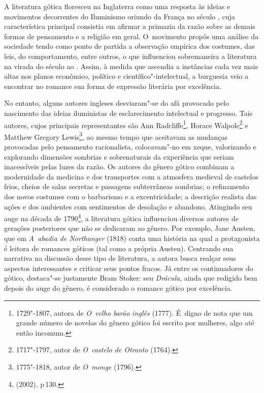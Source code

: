 
A literatura gótica floresceu na Inglaterra como uma resposta às ideias
e movimentos decorrentes do Iluminismo oriundo da França no século
, cuja característica principal consistia em afirmar a primazia da
razão sobre as demais formas de pensamento e a religião em geral. O~movimento propôs uma análise da sociedade tendo como ponto de partida a
observação empírica dos costumes, das leis, do comportamento, entre
outros, o que influenciou sobremaneira a literatura na virada do século
 ao . Assim, à medida que ascendia a instâncias cada vez mais
altas nos planos econômico, político e científico"-intelectual, a
burguesia veio a encontrar no romance sua forma de expressão literária
por excelência.

No entanto, alguns autores ingleses desviaram"-se do afã provocado pelo
nascimento das ideias iluministas de esclarecimento intelectual e
progresso. Tais autores, cujos principais representantes são Ann
Radcliffe\footnote{1729"-1807, autora de \emph{O~velho barão
inglês} (1777). É~digno de nota que um grande número de novelas do
gênero gótico foi escrito por mulheres, algo até então incomum.},
Horace Walpole\footnote{1717"-1797, autor de \emph{O~castelo de
Otranto} (1764).}
 e Matthew Gregory
 Lewis\footnote{1775"-1818, autor de \emph{O~monge} (1796).}, 
ao mesmo tempo que aceitavam as mudanças
provocadas pelo pensamento racionalista, colocavam"-no em xeque,
valorizando e explorando dimensões sombrias e sobrenaturais da
experiência que seriam inacessíveis pelas luzes da razão. Os autores
do gênero gótico combinam a modernidade da medicina e dos transportes
com a atmosfera medieval de castelos frios, cheios de salas secretas e
passagens subterrâneas sombrias; o refinamento dos novos costumes com o
barbarismo e a excentricidade; a descrição realista das ações e dos
ambientes com sentimentos de desolação e abandono. Atingindo seu auge na
década de 1790\footnote{ (2002), p\,130.}, a literatura gótica influenciou
diversos autores de gerações posteriores que não se dedicaram ao gênero.
Por exemplo, Jane Austen, que em \emph{A~abadia de Northanger} (1818)
conta uma história na qual a protagonista é leitora de romances góticos
(tal como a própria Austen). Centrando sua narrativa na discussão desse
tipo de literatura, a autora busca realçar seus aspectos interessantes e
criticar seus pontos fracos. Já entre os continuadores do gótico,
destaca"-se justamente Bram Stoker: seu \emph{Drácula}, ainda que
redigido bem depois do auge do gênero, é considerado o romance gótico
por excelência.

